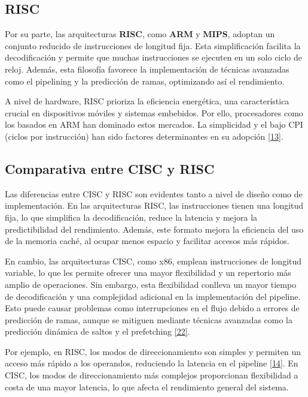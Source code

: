 \documentclass[12pt,oneside]{templates/unerthesis}
\begin{document}
\hypertarget{RISC}{%
\subsection{RISC}\label{RISC}}

Por su parte, las arquitecturas \textbf{RISC}, como \textbf{ARM} y \textbf{MIPS}, adoptan un conjunto reducido de instrucciones de longitud fija. Esta simplificación facilita la decodificación y permite que muchas instrucciones se ejecuten en un solo ciclo de reloj. Además, esta filosofía favorece la implementación de técnicas avanzadas como el pipelining y la predicción de ramas, optimizando así el rendimiento.

A nivel de hardware, RISC prioriza la eficiencia energética, una característica crucial en dispositivos móviles y sistemas embebidos. Por ello, procesadores como los basados en ARM han dominado estos mercados. La simplicidad y el bajo CPI (ciclos por instrucción) han sido factores determinantes en su adopción \protect\hyperlink{ref-hennessy_computer_2012}{{[}13{]}}.

\hypertarget{comparativa-entre-cisc-y-risc}{%
\subsection{Comparativa entre CISC y RISC}\label{comparativa-entre-cisc-y-risc}}

Las diferencias entre CISC y RISC son evidentes tanto a nivel de diseño como de implementación. En las arquitecturas RISC, las instrucciones tienen una longitud fija, lo que simplifica la decodificación, reduce la latencia y mejora la predictibilidad del rendimiento. Además, este formato mejora la eficiencia del uso de la memoria caché, al ocupar menos espacio y facilitar accesos más rápidos.

En cambio, las arquitecturas CISC, como x86, emplean instrucciones de longitud variable, lo que les permite ofrecer una mayor flexibilidad y un repertorio más amplio de operaciones. Sin embargo, esta flexibilidad conlleva un mayor tiempo de decodificación y una complejidad adicional en la implementación del pipeline. Esto puede causar problemas como interrupciones en el flujo debido a errores de predicción de ramas, aunque se mitiguen mediante técnicas avanzadas como la predicción dinámica de saltos y el prefetching \protect\hyperlink{ref-tanenbaum_structured_2013}{{[}22{]}}.

Por ejemplo, en RISC, los modos de direccionamiento son simples y permiten un acceso más rápido a los operandos, reduciendo la latencia en el pipeline \protect\hyperlink{ref-stallings_computer_2013}{{[}14{]}}. En CISC, los modos de direccionamiento más complejos proporcionan flexibilidad a costa de una mayor latencia, lo que afecta el rendimiento general del sistema.
\end{document}
